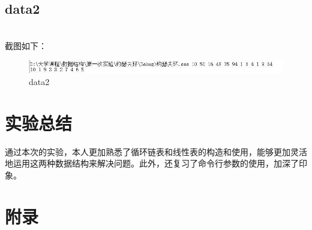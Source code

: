 \documentclass[UTF8]{article}
\begin{document}
	\subsection{data2}
	\\
	截图如下：
	\begin{figure}[H]
		\centering
		\includegraphics[scale=0.7]{data2.jpg}
		\caption{data2}
		\label{data2}
	\end{figure}\par



	\section{实验总结}
	通过本次的实验，本人更加熟悉了循环链表和线性表的构造和使用，能够更加灵活地运用这两种数据结构来解决问题。此外，还复习了命令行参数的使用，加深了印象。




	\section{附录}
\end{document}
